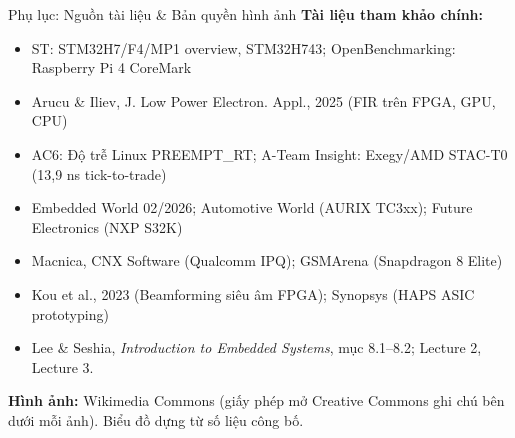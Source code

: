 \begin{frame}{Phụ lục: Nguồn tài liệu \& Bản quyền hình ảnh}
\tiny
\textbf{Tài liệu tham khảo chính:}
\begin{itemize}\setlength{\itemsep}{1pt}
\item ST: STM32H7/F4/MP1 overview, STM32H743; OpenBenchmarking: Raspberry Pi 4 CoreMark
\item Arucu \& Iliev, J. Low Power Electron. Appl., 2025 (FIR trên FPGA, GPU, CPU)
\item AC6: Độ trễ Linux PREEMPT\_RT; A-Team Insight: Exegy/AMD STAC-T0 (13,9 ns tick-to-trade)
\item Embedded World 02/2026; Automotive World (AURIX TC3xx); Future Electronics (NXP S32K)
\item Macnica, CNX Software (Qualcomm IPQ); GSMArena (Snapdragon 8 Elite)
\item Kou et al., 2023 (Beamforming siêu âm FPGA); Synopsys (HAPS ASIC prototyping)
\item Lee \& Seshia, \emph{Introduction to Embedded Systems}, mục 8.1–8.2; Lecture 2, Lecture 3.
\end{itemize}
\par\smallskip
\textbf{Hình ảnh:} Wikimedia Commons (giấy phép mở Creative Commons ghi chú bên dưới mỗi ảnh). Biểu đồ dựng từ số liệu công bố.
\end{frame}
